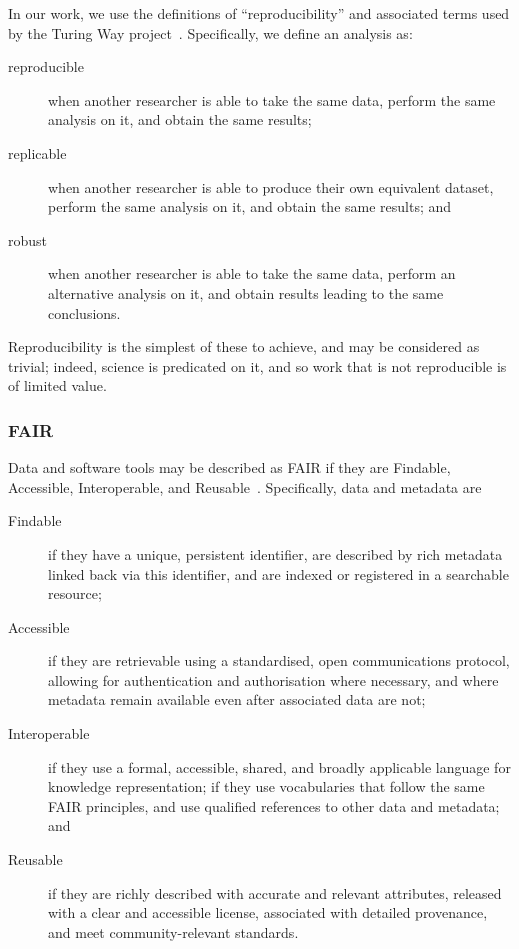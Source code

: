 \documentclass{article}
\begin{document}
In our work,
we use the definitions of ``reproducibility'' and associated terms
used by the Turing Way project~\cite{the_turing_way_community_2023_7625728}.
Specifically,
we define an analysis as:
\begin{description}
  \item[reproducible]
        when another researcher is able to take the same data,
        perform the same analysis on it,
        and obtain the same results;
  \item[replicable]
        when another researcher is able to produce their own equivalent dataset,
        perform the same analysis on it,
        and obtain the same results;
        and
  \item[robust]
        when another researcher is able to take the same data,
        perform an alternative analysis on it,
        and obtain results leading to the same conclusions.
\end{description}
Reproducibility is the simplest of these to achieve,
and may be considered as trivial;
indeed,
science is predicated on it,
and so work that is not reproducible is of limited value.

\subsubsection{FAIR}

Data and software tools may be described as FAIR if they are
Findable, Accessible, Interoperable, and Reusable~\cite{wilkinson2016fair}.
Specifically,
data and metadata are
\begin{description}
  \item[Findable]
        if they have a unique, persistent identifier,
        are described by rich metadata linked back via this identifier,
        and are indexed or registered in a searchable resource;
  \item[Accessible]
        if they are retrievable using a standardised, open communications protocol,
        allowing for authentication and authorisation where necessary,
        and where metadata remain available even after associated data are not;
  \item[Interoperable]
        if they use a formal, accessible, shared, and broadly applicable language for knowledge representation;
        if they use vocabularies that follow the same FAIR principles,
        and use qualified references to other data and metadata;
        and
  \item[Reusable]
        if they are richly described with accurate and relevant attributes,
        released with a clear and accessible license,
        associated with detailed provenance,
        and meet community-relevant standards.
\end{description}
\end{document}
